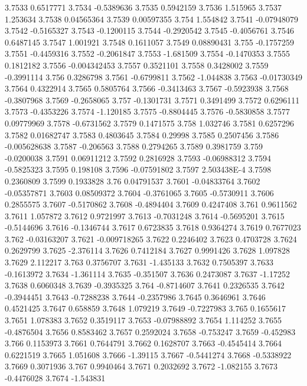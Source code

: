 3.7533  0.6517771
3.7534  -0.5389636
3.7535  0.5942159
3.7536  1.515965
3.7537  1.253634
3.7538  0.04565364
3.7539  0.00597355
3.754  1.554842
3.7541  -0.07948079
3.7542  -0.5165327
3.7543  -0.1200115
3.7544  -0.2920542
3.7545  -0.4056761
3.7546  0.6487145
3.7547  1.001921
3.7548  0.1611057
3.7549  0.08890431
3.755  -0.1757259
3.7551  -0.4459316
3.7552  -0.2061847
3.7553  -1.681509
3.7554  -0.1470353
3.7555  0.1812182
3.7556  -0.004342453
3.7557  0.3521101
3.7558  0.3428002
3.7559  -0.3991114
3.756  0.3286798
3.7561  -0.6799811
3.7562  -1.044838
3.7563  -0.01730349
3.7564  0.4322914
3.7565  0.5805764
3.7566  -0.3413463
3.7567  -0.5923938
3.7568  -0.3807968
3.7569  -0.2658065
3.757  -0.1301731
3.7571  0.3491499
3.7572  0.6296111
3.7573  -0.4353226
3.7574  -1.120185
3.7575  -0.8804445
3.7576  -0.5830858
3.7577  0.09779969
3.7578  -0.6731562
3.7579  0.1471575
3.758  1.032746
3.7581  0.6257296
3.7582  0.01682747
3.7583  0.4803645
3.7584  0.29998
3.7585  0.2507456
3.7586  -0.005628638
3.7587  -0.206563
3.7588  0.2794265
3.7589  0.3981759
3.759  -0.0200038
3.7591  0.06911212
3.7592  0.2816928
3.7593  -0.06988312
3.7594  -0.5825323
3.7595  0.198108
3.7596  -0.07591802
3.7597  2.503438E-4
3.7598  0.2360809
3.7599  0.1933828
3.76  0.04791537
3.7601  -0.04833764
3.7602  -0.05357871
3.7603  0.08509372
3.7604  -0.3761065
3.7605  -0.5730911
3.7606  0.2855575
3.7607  -0.5170862
3.7608  -0.4894404
3.7609  0.4247408
3.761  0.9611562
3.7611  1.057872
3.7612  0.9721997
3.7613  -0.7031248
3.7614  -0.5695201
3.7615  -0.5144696
3.7616  -0.1346744
3.7617  0.6723835
3.7618  0.9364274
3.7619  0.7677023
3.762  -0.03163207
3.7621  -0.009718265
3.7622  0.2246402
3.7623  0.4703728
3.7624  0.2629799
3.7625  -2.376114
3.7626  0.7412184
3.7627  0.9991426
3.7628  1.097828
3.7629  2.112217
3.763  0.3756707
3.7631  -1.435133
3.7632  0.7505397
3.7633  -0.1613972
3.7634  -1.361114
3.7635  -0.351507
3.7636  0.2473087
3.7637  -1.17252
3.7638  0.6060348
3.7639  -0.3935325
3.764  -0.8714607
3.7641  0.2326535
3.7642  -0.3944451
3.7643  -0.7288238
3.7644  -0.2357986
3.7645  0.3646961
3.7646  0.4521425
3.7647  0.658859
3.7648  1.079219
3.7649  -0.7227983
3.765  0.1655617
3.7651  1.078383
3.7652  0.3519117
3.7653  -0.07988892
3.7654  1.114252
3.7655  -0.4876504
3.7656  0.8583462
3.7657  0.2592024
3.7658  -0.753247
3.7659  -0.452983
3.766  0.1153973
3.7661  0.7644791
3.7662  0.1628707
3.7663  -0.4545414
3.7664  0.6221519
3.7665  1.051608
3.7666  -1.39115
3.7667  -0.5441274
3.7668  -0.5338922
3.7669  0.3071936
3.767  0.9940464
3.7671  0.2032692
3.7672  -1.082155
3.7673  -0.4476028
3.7674  -1.543831
